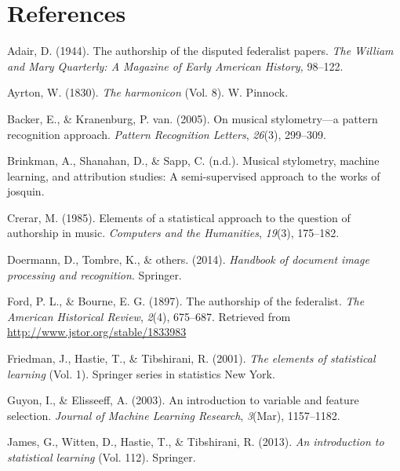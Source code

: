 \documentclass[12pt,twoside]{reedthesis}
\theoremstyle{definition}
\theoremstyle{definition}
\theoremstyle{definition}
\theoremstyle{remark}
\begin{document}
\backmatter

\chapter*{References}\label{references}


\noindent

\setlength{\parindent}{-0.20in} \setlength{\leftskip}{0.20in}
\setlength{\parskip}{8pt}

\hypertarget{refs}{}
\hypertarget{ref-adair1944}{}
Adair, D. (1944). The authorship of the disputed federalist papers.
\emph{The William and Mary Quarterly: A Magazine of Early American
History,} 98--122.

\hypertarget{ref-harmonicon}{}
Ayrton, W. (1830). \emph{The harmonicon} (Vol. 8). W. Pinnock.

\hypertarget{ref-backer2005}{}
Backer, E., \& Kranenburg, P. van. (2005). On musical stylometry---a
pattern recognition approach. \emph{Pattern Recognition Letters},
\emph{26}(3), 299--309.

\hypertarget{ref-brinkman2016}{}
Brinkman, A., Shanahan, D., \& Sapp, C. (n.d.). Musical stylometry,
machine learning, and attribution studies: A semi-supervised approach to
the works of josquin.

\hypertarget{ref-crerar}{}
Crerar, M. (1985). Elements of a statistical approach to the question of
authorship in music. \emph{Computers and the Humanities}, \emph{19}(3),
175--182.

\hypertarget{ref-OMR}{}
Doermann, D., Tombre, K., \& others. (2014). \emph{Handbook of document
image processing and recognition}. Springer.

\hypertarget{ref-authorshipfed}{}
Ford, P. L., \& Bourne, E. G. (1897). The authorship of the federalist.
\emph{The American Historical Review}, \emph{2}(4), 675--687. Retrieved
from \url{http://www.jstor.org/stable/1833983}

\hypertarget{ref-esl}{}
Friedman, J., Hastie, T., \& Tibshirani, R. (2001). \emph{The elements
of statistical learning} (Vol. 1). Springer series in statistics New
York.

\hypertarget{ref-guyon2003}{}
Guyon, I., \& Elisseeff, A. (2003). An introduction to variable and
feature selection. \emph{Journal of Machine Learning Research},
\emph{3}(Mar), 1157--1182.

\hypertarget{ref-isl}{}
James, G., Witten, D., Hastie, T., \& Tibshirani, R. (2013). \emph{An
introduction to statistical learning} (Vol. 112). Springer.
\end{document}
